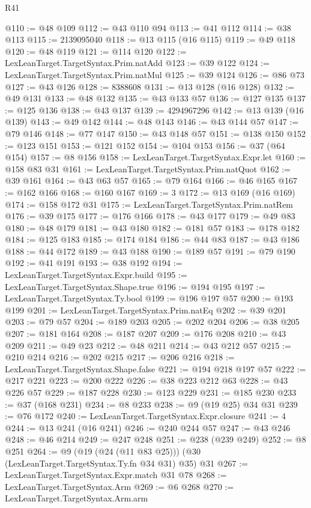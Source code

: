 \begin{lexlean}{R41}
\begin{coremodule}
@110 := @48 @109
@112 := @43 @110 @94
@113 := @41 @112
@114 := @38 @113
@115 := 2139095040
@118 := @13 @115 (@16 @115)
@119 := @49 @118
@120 := @48 @119
@121 := @114 @120
@122 := LexLeanTarget.TargetSyntax.Prim.natAdd
@123 := @39 @122
@124 := LexLeanTarget.TargetSyntax.Prim.natMul
@125 := @39 @124
@126 := @86 @73
@127 := @43 @126
@128 := 8388608
@131 := @13 @128 (@16 @128)
@132 := @49 @131
@133 := @48 @132
@135 := @43 @133 @57
@136 := @127 @135
@137 := @125 @136
@138 := @43 @137
@139 := 4294967296
@142 := @13 @139 (@16 @139)
@143 := @49 @142
@144 := @48 @143
@146 := @43 @144 @57
@147 := @79 @146
@148 := @77 @147
@150 := @43 @148 @57
@151 := @138 @150
@152 := @123 @151
@153 := @121 @152
@154 := @104 @153
@156 := @37 (@64 @154)
@157 := @8 @156
@158 := LexLeanTarget.TargetSyntax.Expr.let
@160 := @158 @83 @31
@161 := LexLeanTarget.TargetSyntax.Prim.natQuot
@162 := @39 @161
@164 := @43 @63 @57
@165 := @79 @164
@166 := @46 @165
@167 := @162 @166
@168 := @160 @167
@169 := 3
@172 := @13 @169 (@16 @169)
@174 := @158 @172 @31
@175 := LexLeanTarget.TargetSyntax.Prim.natRem
@176 := @39 @175
@177 := @176 @166
@178 := @43 @177
@179 := @49 @83
@180 := @48 @179
@181 := @43 @180
@182 := @181 @57
@183 := @178 @182
@184 := @125 @183
@185 := @174 @184
@186 := @44 @83
@187 := @43 @186
@188 := @44 @172
@189 := @43 @188
@190 := @189 @57
@191 := @79 @190
@192 := @41 @191
@193 := @38 @192
@194 := LexLeanTarget.TargetSyntax.Expr.build
@195 := LexLeanTarget.TargetSyntax.Shape.true
@196 := @194 @195
@197 := LexLeanTarget.TargetSyntax.Ty.bool
@199 := @196 @197 @57
@200 := @193 @199
@201 := LexLeanTarget.TargetSyntax.Prim.natEq
@202 := @39 @201
@203 := @79 @57
@204 := @189 @203
@205 := @202 @204
@206 := @38 @205
@207 := @181 @164
@208 := @187 @207
@209 := @176 @208
@210 := @43 @209
@211 := @49 @23
@212 := @48 @211
@214 := @43 @212 @57
@215 := @210 @214
@216 := @202 @215
@217 := @206 @216
@218 := LexLeanTarget.TargetSyntax.Shape.false
@221 := @194 @218 @197 @57
@222 := @217 @221
@223 := @200 @222
@226 := @38 @223 @212 @63
@228 := @43 @226 @57
@229 := @187 @228
@230 := @123 @229
@231 := @185 @230
@233 := @37 (@168 @231)
@234 := @8 @233
@238 := @9 (@19 @25) @34 @31
@239 := @76 @172
@240 := LexLeanTarget.TargetSyntax.Expr.closure
@241 := 4
@244 := @13 @241 (@16 @241)
@246 := @240 @244 @57
@247 := @43 @246
@248 := @46 @214
@249 := @247 @248
@251 := @238 (@239 @249)
@252 := @8 @251
@264 := @9 (@19 (@24 (@11 @83 @25))) (@30 (LexLeanTarget.TargetSyntax.Ty.fn @34 @31) @35) @31
@267 := LexLeanTarget.TargetSyntax.Expr.match @31 @78
@268 := LexLeanTarget.TargetSyntax.Arm
@269 := @6 @268
@270 := LexLeanTarget.TargetSyntax.Arm.arm

\end{coremodule}
\end{lexlean}

